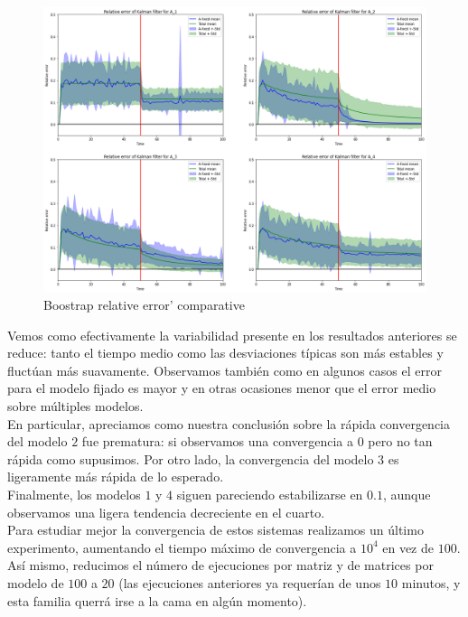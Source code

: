 \documentclass[a4paper]{article}
\begin{document}
\begin{figure}[H]
	\includegraphics[scale=.6]{figures/kalman2}
	\centering
	\caption{Boostrap relative error' comparative}
\end{figure}

Vemos como efectivamente la variabilidad presente en los resultados anteriores se reduce: tanto el tiempo medio como las desviaciones típicas son más estables y fluctúan más suavamente. Observamos también como en algunos casos el error para el modelo fijado es mayor y en otras ocasiones menor que el error medio sobre múltiples modelos. \\

En particular, apreciamos como nuestra conclusión sobre la rápida convergencia del modelo $2$ fue prematura: si observamos una convergencia a $0$ pero no tan rápida como supusimos. Por otro lado, la convergencia del modelo $3$ es ligeramente más rápida de lo esperado. \\

Finalmente, los modelos $1$ y $4$ siguen pareciendo estabilizarse en $0.1$, aunque observamos una ligera tendencia decreciente en el cuarto. \\

Para estudiar mejor la convergencia de estos sistemas realizamos un último experimento, aumentando el tiempo máximo de convergencia a $10^4$ en vez de $100$. Así mismo, reducimos el número de ejecuciones por matriz y de matrices por modelo de $100$ a $20$ (las ejecuciones anteriores ya requerían de unos $10$ minutos, y esta familia querrá irse a la cama en algún momento).
\end{document}
